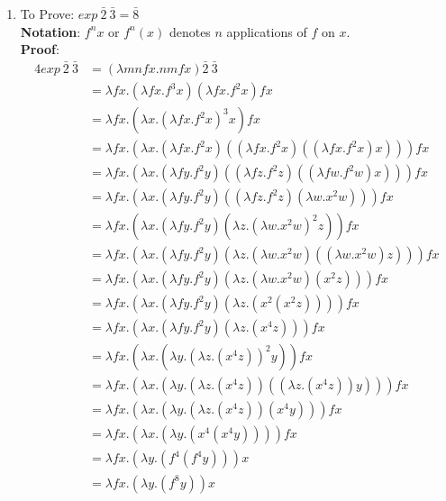 \documentclass[11pt]{article}
\begin{document}
\begin{enumerate}
\begin{enumerate}
\item To Prove: $exp\:\bar{2}\:\bar{3} = \bar{8}$\\
   \textbf{Notation}: $f^n x$ or $f^n(x)$  denotes $n$ applications of $f$ on $x$.\\
          \textbf{Proof}:  \begin{alignat*}{4}
    exp\:\bar{2}\:\bar{3} &= (\lambda mnfx.nm f x)\bar{2}\:\bar{3}\\
    &= \lambda fx. (\lambda fx.f^3 x) (\lambda fx. f^2 x) fx\\
    &= \lambda fx. (\lambda x. (\lambda fx. f^2 x)^3 x) fx\\
    &= \lambda fx. ( \lambda x.   (\lambda fx. f^2 x) ((\lambda fx. f^2 x) ( (\lambda fx. f^2 x) x ))          )fx\\
        &= \lambda fx. ( \lambda x.   (\lambda fy. f^2 y) ((\lambda fz. f^2 z) ( (\lambda fw. f^2 w) x ))          )fx\\
&= \lambda fx. ( \lambda x.   (\lambda fy. f^2 y) ((\lambda fz. f^2 z) ( \lambda w. x^2 w  ))          )fx\\
&= \lambda fx. ( \lambda x.   (\lambda fy. f^2 y) 
      (\lambda z. ( \lambda w. x^2 w  )^2 z)           )fx\\
&= \lambda fx. ( \lambda x.   (\lambda fy. f^2 y) 
      (\lambda z.    ( \lambda w. x^2 w  ) (( \lambda w. x^2 w  ) z)        )           )fx\\
&= \lambda fx. ( \lambda x.   (\lambda fy. f^2 y) 
      (\lambda z.    ( \lambda w. x^2 w  ) ( x^2 z)        )           )fx\\
&= \lambda fx. ( \lambda x.   (\lambda fy. f^2 y) 
      (\lambda z.    (  x^2 ( x^2 z)  )         )           )fx\\
&= \lambda fx. ( \lambda x.   (\lambda fy. f^2 y) 
      (\lambda z.(  x^4 z))           )fx\\
&= \lambda fx. ( \lambda x.   (\lambda y. (\lambda z.(  x^4 z)) ^2 y) 
                )fx\\
&= \lambda fx. ( \lambda x.   (\lambda y. (\lambda z.(  x^4 z))((\lambda z.(  x^4 z)) y)   ) 
                )fx\\
&= \lambda fx. ( \lambda x.   (\lambda y. (\lambda z.(  x^4 z))(x^4 y)   ) 
                )fx\\
&= \lambda fx. ( \lambda x.   (\lambda y. (  x^4 (x^4 y) )  )   )   fx\\
&= \lambda fx.   (\lambda y. (  f^4 (f^4 y) )  ) x\\
&= \lambda fx.   (\lambda y. (  f^8 y )  ) x\\

\end{alignat*}
\end{enumerate}
\end{enumerate}
\end{document}

